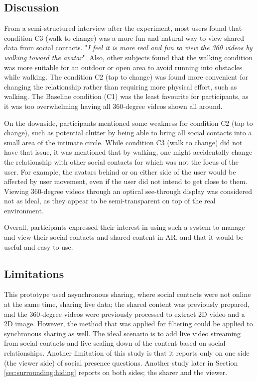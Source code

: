 \subsection{Discussion}

From a semi-structured interview after the experiment, most users found that condition C3 (walk to change) was a more fun and natural way to view shared data from social contacts. "\textit{I feel it is more real and fun to view the 360 videos by walking toward the avatar}". Also, other subjects found that the walking condition was more suitable for an outdoor or open area to avoid running into obstacles while walking. The condition C2 (tap to change) was found more convenient for changing the relationship rather than requiring more physical effort, such as walking. The Baseline condition (C1) was the least favourite for participants, as it was too overwhelming having all 360-degree videos shown all around. 

On the downside, participants mentioned some weakness for condition C2 (tap to change), such as potential clutter by being able to bring all social contacts into a small area of the intimate circle. While condition C3 (walk to change) did not have that issue, it was mentioned that by walking, one might accidentally change the relationship with other social contacts for which was not the focus of the user. For example, the avatars behind or on either side of the user would be affected by user movement, even if the user did not intend to get close to them. Viewing 360-degree videos through an optical see-through display was considered not as ideal, as they appear to be semi-transparent on top of the real environment. 

Overall, participants expressed their interest in using such a system to manage and view their social contacts and shared content in AR, and that it would be useful and easy to use. 

\subsection{Limitations}

This prototype used asynchronous sharing, where social contacts were not online at the same time, sharing live data; the shared content was previously prepared, and the 360-degree videos were previously processed to extract 2D video and a 2D image. However, the method that was applied for filtering could be applied to synchronous sharing as well. The ideal scenario is to add live video streaming from social contacts and live scaling down of the content based on social relationships. Another limitation of this study is that it reports only on one side (the viewer side) of social presence questions. Another study later in Section \ref{sec:surrounding:hiding} reports on both sides; the sharer and the viewer. 


